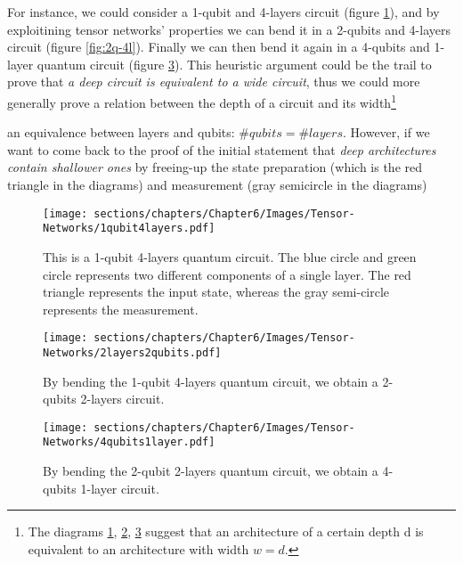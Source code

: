 \begin{itemize}
    For instance, we could consider a 1-qubit and 4-layers circuit (figure \ref{fig:1q-4l}), and by 
    exploitining tensor networks' properties we can bend it in a 2-qubits and 4-layers circuit 
    (figure \ref{fig:2q-4l}).
    Finally we can then bend it again in a 4-qubits and 1-layer quantum circuit (figure \ref{fig:4q-1l}).
    This heuristic argument could be the trail to prove that \textit{a deep circuit is equivalent to a 
    wide circuit}, thus we could more generally prove a relation between the depth of a circuit and 
    its width\footnote[1]{The diagrams \ref{fig:1q-4l}, \ref{fig:2q-2l}, \ref{fig:4q-1l} suggest 
    that an architecture of a certain depth d is equivalent to an architecture with width $w = d$.}
    
    
    an equivalence between layers and qubits: 
    $\# qubits = \# layers$.
    However, if we want to come back to the proof of the initial statement that \textit{deep architectures 
    contain shallower ones} by freeing-up the state preparation (which is the red triangle in the 
    diagrams) and measurement (gray semicircle in the diagrams) 

    \begin{figure}[h]
        \centering
        \texttt{[image: sections/chapters/Chapter6/Images/Tensor-Networks/1qubit4layers.pdf]}
        \caption{This is a 1-qubit 4-layers quantum circuit. The blue circle and green circle represents two
        different components of a single layer. The red triangle represents the input state, whereas the 
        gray semi-circle represents the measurement.}
        \label{fig:1q-4l}
    \end{figure}


    \begin{figure}[h]
        \centering
        \texttt{[image: sections/chapters/Chapter6/Images/Tensor-Networks/2layers2qubits.pdf]}
        \caption{By bending the 1-qubit 4-layers quantum circuit, we obtain a 2-qubits 2-layers circuit.}
        \label{fig:2q-2l}
    \end{figure}


    \begin{figure}[h]
        \centering
        \texttt{[image: sections/chapters/Chapter6/Images/Tensor-Networks/4qubits1layer.pdf]}
        \caption{By bending the 2-qubit 2-layers quantum circuit, we obtain a 4-qubits 1-layer circuit.}
        \label{fig:4q-1l}
    \end{figure}

    


\end{itemize}